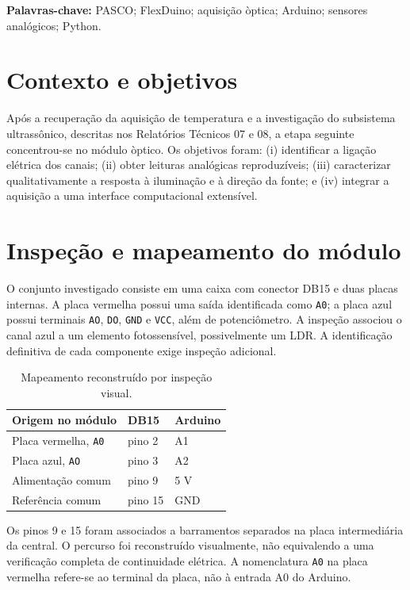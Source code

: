 \documentclass[10pt,a4paper,twocolumn]{article}
\begin{document}
\noindent\textbf{Palavras-chave:} PASCO; FlexDuino; aquisi\c{c}\~ao \`optica; Arduino; sensores anal\'ogicos; Python.

\section{Contexto e objetivos}
Ap\'os a recupera\c{c}\~ao da aquisi\c{c}\~ao de temperatura e a investiga\c{c}\~ao do subsistema ultrass\^onico, descritas nos Relat\'orios T\'ecnicos 07 e 08, a etapa seguinte concentrou-se no m\'odulo \`optico. Os objetivos foram: (i) identificar a liga\c{c}\~ao el\'etrica dos canais; (ii) obter leituras anal\'ogicas reproduz\'iveis; (iii) caracterizar qualitativamente a resposta \`a ilumina\c{c}\~ao e \`a dire\c{c}\~ao da fonte; e (iv) integrar a aquisi\c{c}\~ao a uma interface computacional extens\'ivel.

\section{Inspe\c{c}\~ao e mapeamento do m\'odulo}
O conjunto investigado consiste em uma caixa com conector DB15 e duas placas internas. A placa vermelha possui uma sa\'ida identificada como \texttt{A0}; a placa azul possui terminais \texttt{AO}, \texttt{DO}, \texttt{GND} e \texttt{VCC}, al\'em de potenci\^ometro. A inspe\c{c}\~ao associou o canal azul a um elemento fotossens\'ivel, possivelmente um LDR. A identifica\c{c}\~ao definitiva de cada componente exige inspe\c{c}\~ao adicional.

\begin{table}[H]
\centering\footnotesize
\caption{Mapeamento reconstru\'ido por inspe\c{c}\~ao visual.}
\begin{tabular}{@{}p{}p{}p{}@{}}
\toprule
Origem no m\'odulo & DB15 & Arduino \\
\midrule
Placa vermelha, \texttt{A0} & pino 2 & A1 \\
Placa azul, \texttt{AO} & pino 3 & A2 \\
Alimenta\c{c}\~ao comum & pino 9 & 5 V \\
Refer\^encia comum & pino 15 & GND \\
\bottomrule
\end{tabular}
\end{table}

Os pinos 9 e 15 foram associados a barramentos separados na placa intermedi\'aria da central. O percurso foi reconstru\'ido visualmente, n\~ao equivalendo a uma verifica\c{c}\~ao completa de continuidade el\'etrica. A nomenclatura \texttt{A0} na placa vermelha refere-se ao terminal da placa, n\~ao \`a entrada A0 do Arduino.
\end{document}
